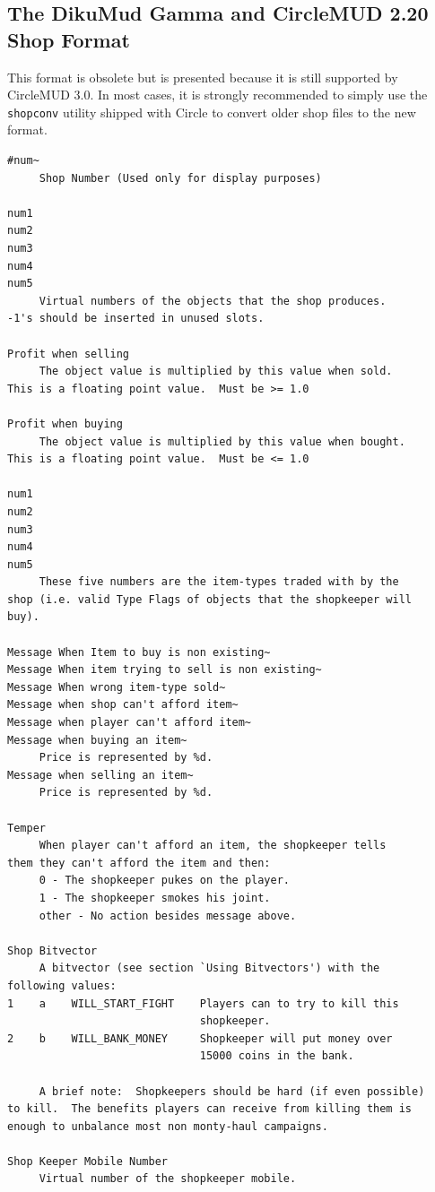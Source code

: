 \documentclass[11pt]{article}
\begin{document}
\subsection{The DikuMud Gamma and CircleMUD 2.20 Shop Format}
This format is obsolete but is presented because it is still supported by CircleMUD 3.0.  In most cases, it is strongly recommended to simply use the \texttt{shopconv} utility shipped with Circle to convert older shop files to the new format.
\begin{verbatim}
#num~
     Shop Number (Used only for display purposes)

num1
num2
num3
num4
num5
     Virtual numbers of the objects that the shop produces.
-1's should be inserted in unused slots.

Profit when selling
     The object value is multiplied by this value when sold.
This is a floating point value.  Must be >= 1.0

Profit when buying
     The object value is multiplied by this value when bought.
This is a floating point value.  Must be <= 1.0

num1
num2
num3
num4
num5
     These five numbers are the item-types traded with by the
shop (i.e. valid Type Flags of objects that the shopkeeper will
buy).

Message When Item to buy is non existing~
Message When item trying to sell is non existing~
Message When wrong item-type sold~
Message when shop can't afford item~
Message when player can't afford item~
Message when buying an item~
     Price is represented by %d.
Message when selling an item~
     Price is represented by %d.

Temper
     When player can't afford an item, the shopkeeper tells
them they can't afford the item and then:
     0 - The shopkeeper pukes on the player.
     1 - The shopkeeper smokes his joint.
     other - No action besides message above.

Shop Bitvector
     A bitvector (see section `Using Bitvectors') with the
following values:
1    a    WILL_START_FIGHT    Players can to try to kill this
                              shopkeeper.
2    b    WILL_BANK_MONEY     Shopkeeper will put money over
                              15000 coins in the bank.

     A brief note:  Shopkeepers should be hard (if even possible)
to kill.  The benefits players can receive from killing them is
enough to unbalance most non monty-haul campaigns.

Shop Keeper Mobile Number
     Virtual number of the shopkeeper mobile.


\end{verbatim}
\end{document}
